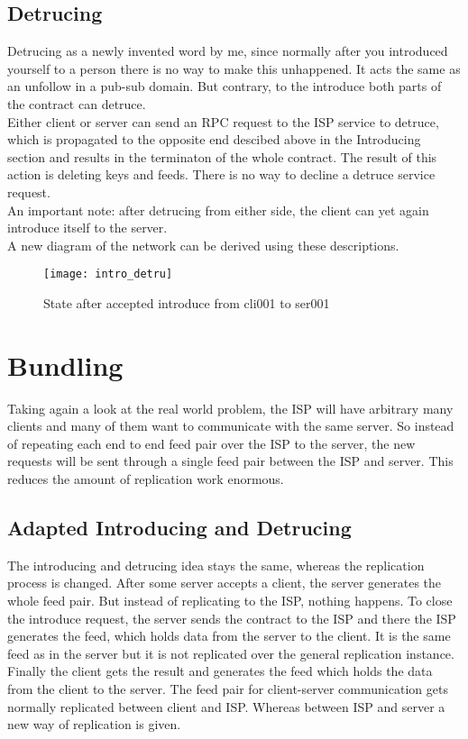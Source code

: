 \subsection{Detrucing}
Detrucing as a newly invented word by me, since normally after you introduced yourself to a person there is no way to make this unhappened. It acts the same as an unfollow in a pub-sub domain. But contrary, to the introduce both parts of the contract can detruce. \\
Either client or server can send an RPC request to the ISP service to detruce, which is propagated to the opposite end descibed above in the Introducing section and results in the terminaton of the whole contract. The result of this action is deleting keys and feeds. There is no way to decline a detruce service request.
\\
An important note: after detrucing from either side, the client can yet again introduce itself to the server.
\\
A new diagram of the network can be derived using these descriptions.
\begin{figure}
    \centering
    \texttt{[image: intro\_detru]}
    \caption{State after accepted introduce from cli001 to ser001}
    \label{fig:contract_cli_isp}
\end{figure}

\pagebreak

\section{Bundling}
Taking again a look at the real world problem, the ISP will have arbitrary many clients and many of them want to communicate with the same server. So instead of repeating each end to end feed pair over the ISP to the server, the new requests will be sent through a single feed pair between the ISP and server. This reduces the amount of replication work enormous.

\subsection{Adapted Introducing and Detrucing}
The introducing and detrucing idea stays the same, whereas the replication process is changed. After some server accepts a client, the server generates the whole feed pair. But instead of replicating to the ISP, nothing happens. To close the introduce request, the server sends the contract to the ISP and there the ISP generates the feed, which holds data from the server to the client. It is the same feed as in the server but it is not replicated over the general replication instance. Finally the client gets the result and generates the feed which holds the data from the client to the server. The feed pair for client-server communication gets normally replicated between client and ISP. Whereas between ISP and server a new way of replication is given.

